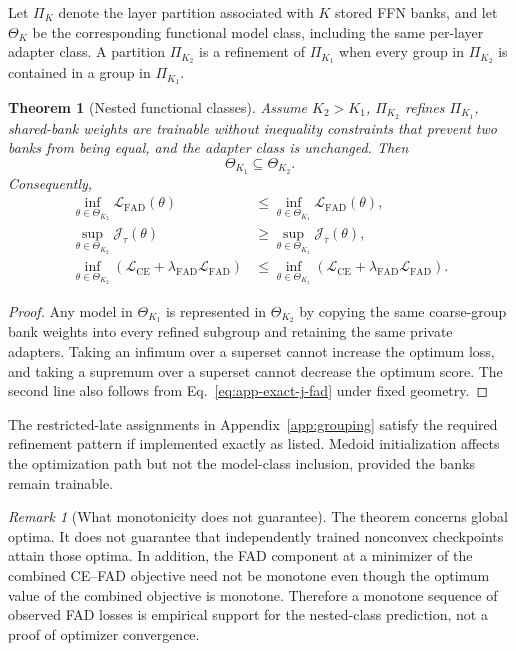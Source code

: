 \documentclass{article}
\newcommand{\calL}{\mathcal{L}}
\newcommand{\FAD}{\mathrm{FAD}}
\newcommand{\CE}{\mathrm{CE}}
\theoremstyle{plain}
\newtheorem{theorem}{Theorem}
\theoremstyle{definition}
\theoremstyle{remark}
\newtheorem{remark}{Remark}
\begin{document}
Let $\Pi_K$ denote the layer partition associated with $K$ stored FFN banks, and
let $\Theta_K$ be the corresponding functional model class, including the same
per-layer adapter class.  A partition $\Pi_{K_2}$ is a refinement of
$\Pi_{K_1}$ when every group in $\Pi_{K_2}$ is contained in a group in
$\Pi_{K_1}$.

\begin{theorem}[Nested functional classes]
\label{thm:app-nested-classes}
Assume $K_2>K_1$, $\Pi_{K_2}$ refines $\Pi_{K_1}$, shared-bank weights are
trainable without inequality constraints that prevent two banks from being equal,
and the adapter class is unchanged.  Then
\begin{equation}
  \Theta_{K_1}\subseteq\Theta_{K_2}.
  \label{eq:app-class-inclusion}
\end{equation}
Consequently,
\begin{equation}
\begin{aligned}
  \inf_{\theta\in\Theta_{K_2}}\calL_{\FAD}(\theta)
  &\le\inf_{\theta\in\Theta_{K_1}}\calL_{\FAD}(\theta),\\
  \sup_{\theta\in\Theta_{K_2}}\mathcal J_\tau(\theta)
  &\ge\sup_{\theta\in\Theta_{K_1}}\mathcal J_\tau(\theta),\\
  \inf_{\theta\in\Theta_{K_2}}
  \left(\calL_{\CE}+\lambda_{\FAD}\calL_{\FAD}\right)
  &\le\inf_{\theta\in\Theta_{K_1}}
  \left(\calL_{\CE}+\lambda_{\FAD}\calL_{\FAD}\right).
  \label{eq:app-nested-optima}
\end{aligned}
\end{equation}
\end{theorem}

\begin{proof}
Any model in $\Theta_{K_1}$ is represented in $\Theta_{K_2}$ by copying the same
coarse-group bank weights into every refined subgroup and retaining the same
private adapters.  Taking an infimum over a superset cannot increase the optimum
loss, and taking a supremum over a superset cannot decrease the optimum score.
The second line also follows from Eq.~\eqref{eq:app-exact-j-fad} under fixed
geometry.
\end{proof}

The restricted-late assignments in Appendix~\ref{app:grouping} satisfy the
required refinement pattern if implemented exactly as listed.  Medoid
initialization affects the optimization path but not the model-class inclusion,
provided the banks remain trainable.

\begin{remark}[What monotonicity does not guarantee]
\label{rem:app-trained-monotonicity}
The theorem concerns global optima.  It does not guarantee that independently
trained nonconvex checkpoints attain those optima.  In addition, the FAD component
at a minimizer of the combined CE--FAD objective need not be monotone even though
the optimum value of the combined objective is monotone.  Therefore a monotone
sequence of observed FAD losses is empirical support for the nested-class
prediction, not a proof of optimizer convergence.
\end{remark}
\end{document}
